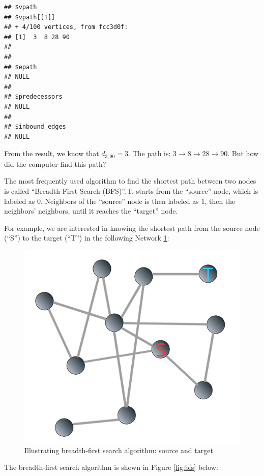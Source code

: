 \documentclass[
]{krantz}
\begin{document}
\begin{verbatim}
## $vpath
## $vpath[[1]]
## + 4/100 vertices, from fcc3d0f:
## [1]  3  8 28 90
## 
## 
## $epath
## NULL
## 
## $predecessors
## NULL
## 
## $inbound_edges
## NULL
\end{verbatim}

From the result, we know that \(d_{3, 90} = 3\). The path is: \(3 \to 8 \to 28 \to 90\). But how did the computer find this path?

The most frequently used algorithm to find the shortest path between two nodes is called ``Breadth-First Search (BFS)''. It starts from the ``source'' node, which is labeled as \(0\). Neighbors of the ``source'' node is then labeled as \(1\), then the neighbors' neighbors, until it reaches the ``target'' node.

For example, we are interested in knowing the shortest path from the source node (``S'') to the target (``T'') in the following Network \ref{fig:bfs01}:

\begin{figure}

{\centering \includegraphics[width=0.55\linewidth]{images/bfs01} 

}

\caption{Illustrating breadth-first search algorithm: source and target}\label{fig:bfs01}
\end{figure}

The breadth-first search algorithm is shown in Figure \ref{fig:bfs} below:
\end{document}
